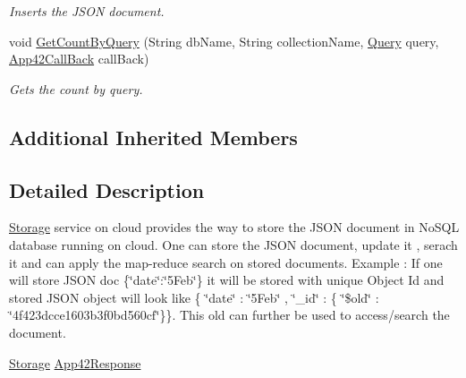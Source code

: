 \begin{DoxyCompactItemize}
\begin{DoxyCompactList}\small\item\em Inserts the J\+S\+O\+N document. \end{DoxyCompactList}\item 
void \hyperlink{classcom_1_1shephertz_1_1app42_1_1paas_1_1sdk_1_1csharp_1_1storage_1_1_storage_service_a845bfc96016e7388a6b699873a6f9b04}{Get\+Count\+By\+Query} (String db\+Name, String collection\+Name, \hyperlink{classcom_1_1shephertz_1_1app42_1_1paas_1_1sdk_1_1csharp_1_1storage_1_1_query}{Query} query, \hyperlink{interfacecom_1_1shephertz_1_1app42_1_1paas_1_1sdk_1_1csharp_1_1_app42_call_back}{App42\+Call\+Back} call\+Back)
\begin{DoxyCompactList}\small\item\em Gets the count by query. \end{DoxyCompactList}\end{DoxyCompactItemize}
\subsection*{Additional Inherited Members}


\subsection{Detailed Description}
\hyperlink{classcom_1_1shephertz_1_1app42_1_1paas_1_1sdk_1_1csharp_1_1storage_1_1_storage}{Storage} service on cloud provides the way to store the J\+S\+O\+N document in No\+S\+Q\+L database running on cloud. One can store the J\+S\+O\+N document, update it , serach it and can apply the map-\/reduce search on stored documents. Example \+: If one will store J\+S\+O\+N doc \{\char`\"{}date\char`\"{}\+:\char`\"{}5\+Feb\char`\"{}\} it will be stored with unique Object Id and stored J\+S\+O\+N object will look like \{ \char`\"{}date\char`\"{} \+: \char`\"{}5\+Feb\char`\"{} , \char`\"{}\+\_\+id\char`\"{} \+: \{ \char`\"{}\$old\char`\"{} \+: \char`\"{}4f423dcce1603b3f0bd560cf\char`\"{}\}\}. This old can further be used to access/search the document. 

\hyperlink{classcom_1_1shephertz_1_1app42_1_1paas_1_1sdk_1_1csharp_1_1storage_1_1_storage_service}{Storage} \hyperlink{classcom_1_1shephertz_1_1app42_1_1paas_1_1sdk_1_1csharp_1_1storage_1_1_storage_service}{App42\+Response} 

